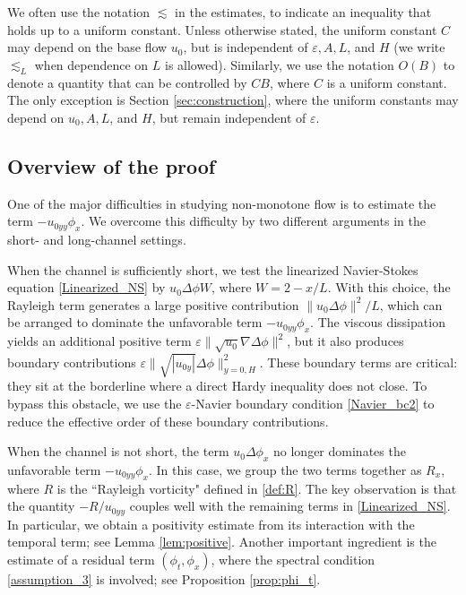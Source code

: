\documentclass[reqno, 11pt]{amsart}
\theoremstyle{plain}
\theoremstyle{definition}
\theoremstyle{remark}
\numberwithin{equation}{section}
\begin{document}
We often use the notation $\lesssim$ in the estimates, to indicate an inequality that holds up to a uniform constant. Unless otherwise stated, the uniform constant $C$ may depend on the base flow $u_0$, but is independent of $\varepsilon, A, L$, and $H$ (we write $\lesssim_L$ when dependence on $L$ is allowed). Similarly, we use the notation $O(B)$ to denote a quantity that can be controlled by $CB$, where $C$ is a uniform constant. The only exception is Section \ref{sec:construction}, where the uniform constants may depend on $u_0, A, L$, and $H$, but remain independent of $\varepsilon$.\\

\subsection{Overview of the proof}

One of the major difficulties in studying non-monotone flow is to estimate the term $-u_{0yy} \phi_x$. We overcome this difficulty by two different arguments in the short- and long-channel settings.

When the channel is sufficiently short, we test the linearized Navier-Stokes equation \eqref{Linearized_NS} by $u_0 \Delta \phi W$, where $W = 2-x/L$. With this choice, the Rayleigh term generates a large positive contribution $\|u_0 \Delta \phi\|^2/L$, which can be arranged to dominate the unfavorable term $-u_{0yy} \phi_x$. The viscous dissipation yields an additional positive term $\varepsilon\|\sqrt{u_0} \nabla \Delta \phi\|^2$, but it also produces boundary contributions $\varepsilon \| \sqrt{|u_{0y}|} \Delta \phi \|^2_{y=0,H}$. These boundary terms are critical: they sit at the borderline where a direct Hardy inequality does not close. To bypass this obstacle, we use the $\varepsilon$-Navier boundary condition \eqref{Navier_bc2} to reduce the effective order of these boundary contributions.

When the channel is not short, the term $u_0 \Delta \phi_x$ no longer dominates the unfavorable term $-u_{0yy} \phi_x$. In this case, we group the two terms together as $R_x$, where $R$ is the ``Rayleigh vorticity" defined in \eqref{def:R}. The key observation is that the quantity $-R/u_{0yy}$ couples well with the remaining terms in \eqref{Linearized_NS}. In particular, we obtain a positivity estimate from its interaction with the temporal term; see Lemma \ref{lem:positive}. Another important ingredient is the estimate of a residual term $(\phi_t, \phi_x)$, where the spectral condition \eqref{assumption_3} is involved; see Proposition \ref{prop:phi_t}.
\end{document}
